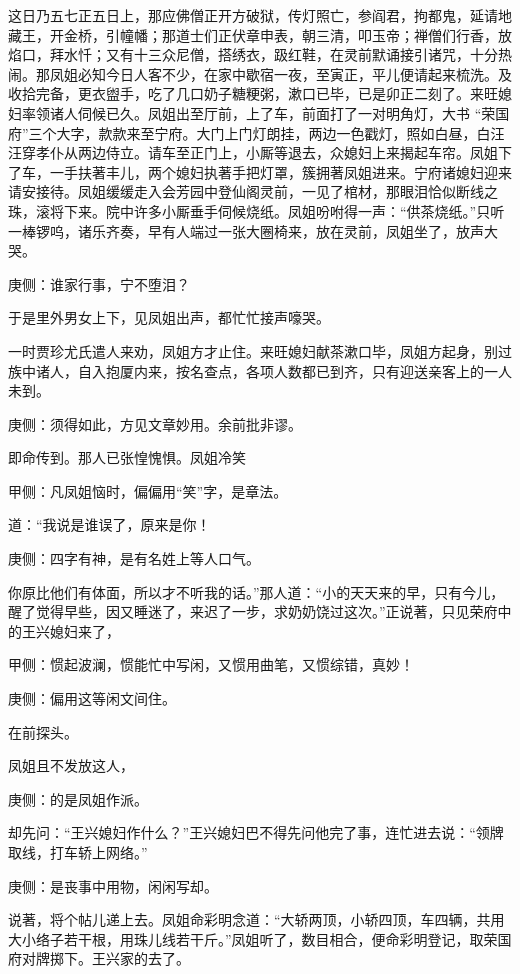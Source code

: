 \begin{parag}
    这日乃五七正五日上，那应佛僧正开方破狱，传灯照亡，参阎君，拘都鬼，延请地藏王，开金桥，引幢幡；那道士们正伏章申表，朝三清，叩玉帝；禅僧们行香，放焰口，拜水忏；又有十三众尼僧，搭绣衣，趿红鞋，在灵前默诵接引诸咒，十分热闹。那凤姐必知今日人客不少，在家中歇宿一夜，至寅正，平儿便请起来梳洗。及收拾完备，更衣盥手，吃了几口奶子糖粳粥，漱口已毕，已是卯正二刻了。来旺媳妇率领诸人伺候已久。凤姐出至厅前，上了车，前面打了一对明角灯，大书 “荣国府”三个大字，款款来至宁府。大门上门灯朗挂，两边一色戳灯，照如白昼，白汪汪穿孝仆从两边侍立。请车至正门上，小厮等退去，众媳妇上来揭起车帘。凤姐下了车，一手扶著丰儿，两个媳妇执著手把灯罩，簇拥著凤姐进来。宁府诸媳妇迎来请安接待。凤姐缓缓走入会芳园中登仙阁灵前，一见了棺材，那眼泪恰似断线之珠，滚将下来。院中许多小厮垂手伺候烧纸。凤姐吩咐得一声：“供茶烧纸。”只听一棒锣呜，诸乐齐奏，早有人端过一张大圈椅来，放在灵前，凤姐坐了，放声大哭。\begin{note}庚侧：谁家行事，宁不堕泪？\end{note}于是里外男女上下，见凤姐出声，都忙忙接声嚎哭。
\end{parag}


\begin{parag}
    一时贾珍尤氏遣人来劝，凤姐方才止住。来旺媳妇献茶漱口毕，凤姐方起身，别过族中诸人，自入抱厦内来，按名查点，各项人数都已到齐，只有迎送亲客上的一人未到。\begin{note}庚侧：须得如此，方见文章妙用。余前批非谬。\end{note}即命传到。那人已张惶愧惧。凤姐冷笑\begin{note}甲侧：凡凤姐恼时，偏偏用“笑”字，是章法。\end{note}道：“我说是谁误了，原来是你！\begin{note}庚侧：四字有神，是有名姓上等人口气。\end{note}你原比他们有体面，所以才不听我的话。”那人道：“小的天天来的早，只有今儿，醒了觉得早些，因又睡迷了，来迟了一步，求奶奶饶过这次。”正说著，只见荣府中的王兴媳妇来了，\begin{note}甲侧：惯起波澜，惯能忙中写闲，又惯用曲笔，又惯综错，真妙！\end{note}\begin{note}庚侧：偏用这等闲文间住。\end{note}在前探头。
\end{parag}


\begin{parag}
    凤姐且不发放这人，\begin{note}庚侧：的是凤姐作派。\end{note}却先问：“王兴媳妇作什么？”王兴媳妇巴不得先问他完了事，连忙进去说：“领牌取线，打车轿上网络。”\begin{note}庚侧：是丧事中用物，闲闲写却。\end{note}说著，将个帖儿递上去。凤姐命彩明念道：“大轿两顶，小轿四顶，车四辆，共用大小络子若干根，用珠儿线若干斤。”凤姐听了，数目相合，便命彩明登记，取荣国府对牌掷下。王兴家的去了。
\end{parag}


